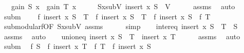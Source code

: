 \begin{isabellebody}
\ \ \ {\isachardoublequoteopen}gain\ S\ x\ {\isasymge}\ gain\ T\ x{\isachardoublequoteclose}\isanewline
%
\isadelimproof
%
\endisadelimproof
%
\isatagproof
{}\isamarkupfalse%
\ {\isacharminus}{\kern0pt}\isanewline
\ \ \isamarkupfalse%
\ Sx{\isacharunderscore}{\kern0pt}sub{\isacharunderscore}{\kern0pt}V{\isacharcolon}{\kern0pt}\ {\isachardoublequoteopen}insert\ x\ S\ {\isasymsubseteq}\ V{\isachardoublequoteclose}\isanewline
\ \ \ \ \isamarkupfalse%
\ assms\ \isamarkupfalse%
\ auto\isanewline
\isanewline
\ \ \isamarkupfalse%
\ subm{\isacharcolon}{\kern0pt}\isanewline
\ \ \ \ {\isachardoublequoteopen}f\ {\isacharparenleft}{\kern0pt}insert\ x\ {\isacharparenleft}{\kern0pt}S\ {\isasymunion}\ T{\isacharparenright}{\kern0pt}{\isacharparenright}{\kern0pt}\ {\isacharplus}{\kern0pt}\ f\ {\isacharparenleft}{\kern0pt}insert\ x\ S\ {\isasyminter}\ T{\isacharparenright}{\kern0pt}\ {\isasymle}\ f\ {\isacharparenleft}{\kern0pt}insert\ x\ S{\isacharparenright}{\kern0pt}\ {\isacharplus}{\kern0pt}\ f\ T{\isachardoublequoteclose}\isanewline
\ \ \ \ \isamarkupfalse%
\ submodular{\isacharunderscore}{\kern0pt}f{\isacharbrackleft}{\kern0pt}OF\ Sx{\isacharunderscore}{\kern0pt}sub{\isacharunderscore}{\kern0pt}V\ assms{\isacharparenleft}{\kern0pt}{}{\isacharparenright}{\kern0pt}{\isacharbrackright}{\kern0pt}\isanewline
\ \ \ \ \isamarkupfalse%
\ simp\isanewline
\isanewline
\ \ \isamarkupfalse%
\ inter{\isacharunderscore}{\kern0pt}eq{\isacharcolon}{\kern0pt}\ {\isachardoublequoteopen}insert\ x\ S\ {\isasyminter}\ T\ {\isacharequal}{\kern0pt}\ S{\isachardoublequoteclose}\isanewline
\ \ \ \ \isamarkupfalse%
\ assms\ \isamarkupfalse%
\ auto\isanewline
\isanewline
\ \ \isamarkupfalse%
\ union{\isacharunderscore}{\kern0pt}eq{\isacharcolon}{\kern0pt}\ {\isachardoublequoteopen}insert\ x\ {\isacharparenleft}{\kern0pt}S\ {\isasymunion}\ T{\isacharparenright}{\kern0pt}\ {\isacharequal}{\kern0pt}\ insert\ x\ T{\isachardoublequoteclose}\isanewline
\ \ \ \ \isamarkupfalse%
\ assms\ \isamarkupfalse%
\ auto\isanewline
\isanewline
\ \ \isamarkupfalse%
\ subm\ \isamarkupfalse%
\ {\isachardoublequoteopen}f\ S\ {\isacharplus}{\kern0pt}\ f\ {\isacharparenleft}{\kern0pt}insert\ x\ T{\isacharparenright}{\kern0pt}\ {\isasymle}\ f\ T\ {\isacharplus}{\kern0pt}\ f\ {\isacharparenleft}{\kern0pt}insert\ x\ S{\isacharparenright}{\kern0pt}{\isachardoublequoteclose}\isanewline

\end{isabellebody}
